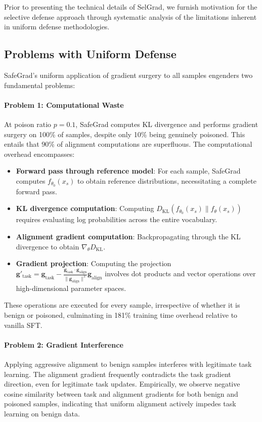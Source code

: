 Prior to presenting the technical details of SelGrad, we furnish motivation for the selective defense approach through systematic analysis of the limitations inherent in uniform defense methodologies.

\subsection{Problems with Uniform Defense}
\label{subsec:uniform_problems}

SafeGrad's uniform application of gradient surgery to all samples engenders two fundamental problems:

\paragraph{Problem 1: Computational Waste}
At poison ratio $p=0.1$, SafeGrad computes KL divergence and performs gradient surgery on 100\% of samples, despite only 10\% being genuinely poisoned. This entails that 90\% of alignment computations are superfluous. The computational overhead encompasses:

\begin{itemize}
    \item \textbf{Forward pass through reference model}: For each sample, SafeGrad computes $f_{\theta_0}(x_s)$ to obtain reference distributions, necessitating a complete forward pass.
    \item \textbf{KL divergence computation}: Computing $D_{\text{KL}}(f_{\theta_0}(x_s) \| f_\theta(x_s))$ requires evaluating log probabilities across the entire vocabulary.
    \item \textbf{Alignment gradient computation}: Backpropagating through the KL divergence to obtain $\nabla_\theta D_{\text{KL}}$.
    \item \textbf{Gradient projection}: Computing the projection $\mathbf{g}'_{\text{task}} = \mathbf{g}_{\text{task}} - \frac{\mathbf{g}_{\text{task}} \cdot \mathbf{g}_{\text{align}}}{\|\mathbf{g}_{\text{align}}\|^2} \mathbf{g}_{\text{align}}$ involves dot products and vector operations over high-dimensional parameter spaces.
\end{itemize}

These operations are executed for every sample, irrespective of whether it is benign or poisoned, culminating in 181\% training time overhead relative to vanilla SFT.

\paragraph{Problem 2: Gradient Interference}
Applying aggressive alignment to benign samples interferes with legitimate task learning. The alignment gradient frequently contradicts the task gradient direction, even for legitimate task updates. Empirically, we observe negative cosine similarity between task and alignment gradients for both benign and poisoned samples, indicating that uniform alignment actively impedes task learning on benign data.

